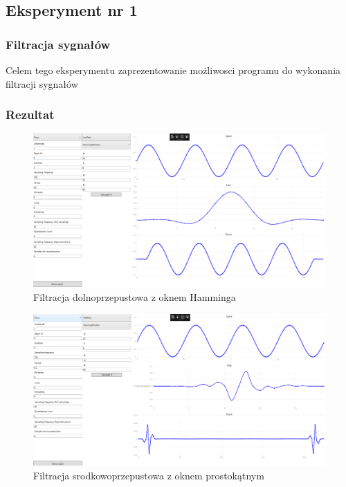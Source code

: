 \documentclass[12pt]{article}
\begin{document}

\subsection{Eksperyment nr 1 }
\subsubsection{Filtracja sygnałów}
Celem tego eksperymentu zaprezentowanie możliwosci programu do wykonania filtracji sygnałów

\subsubsection{Rezultat}
\begin{figure}[H]
 \centering
 \includegraphics[width=14cm]{images/lowham.PNG}
 \vspace{-0.3cm}
 \caption{Filtracja dolnoprzepustowa z oknem Hamminga}
 \label{gui}
\end{figure}
\begin{figure}[H]
 \centering
 \includegraphics[width=14cm]{images/midhan.PNG}
 \vspace{-0.3cm}
 \caption{Filtracja srodkowoprzepustowa z oknem prostokątnym}
 \label{gui}
\end{figure}
\end{document}
